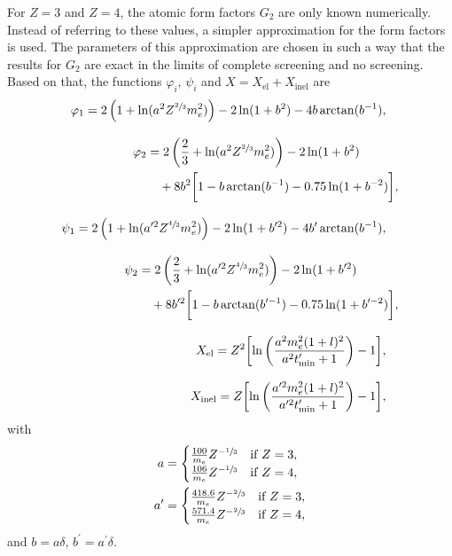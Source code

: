 For $Z=3$ and $Z=4$, the atomic form factors $G_2$ are only known numerically.
Instead of referring to these values, a simpler approximation for the form factors is used.
The parameters of this approximation are chosen in such a way that the results for $G_2$ are exact in the limits of complete screening and no screening.
Based on that, the functions $\varphi_i$, $\psi_i$ and $X = X_{\text{el}} + X_{\text{inel}}$ are \cite{RevModPhys.46.815}
%
\begingroup
\allowdisplaybreaks
\begin{align}
	\label{eqn:phi_1}
	\begin{split}
		\varphi_1 &= 2\left(1 + \ln(a^2 Z^{\sfrac{2}{3}} m_e^2)\right) - 2 \ln(1 + b^2) - 4 b \arctan(b^{-1}),
	\end{split}
	\\[2ex]
	\begin{split}
		\varphi_2 &= 2 \left(\frac{2}{3} + \ln(a^2 Z^{\sfrac{2}{3}} m_e^2 )\right) - 2 \ln(1 + b^2) \\&\quad+ 8 b^2  \biggl[ 1 - b \arctan(b^{-1}) - 0.75 \ln(1 + b^{-2}) \biggr],
	\end{split}
	\\[2ex]
	\begin{split}
		\psi_1 &= 2\left(1 + \ln(a^{\prime2} Z^{\sfrac{4}{3}} m_e^2)\right) - 2 \ln(1 + b^{\prime2}) - 4 b^{\prime} \arctan(b^{-1}),
	\end{split}
	\\[2ex]
	\begin{split}
		\psi_2 &= 2 \left(\frac{2}{3} + \ln(a^{\prime2} Z^{\sfrac{4}{3}} m_e^2 )\right) - 2 \ln(1 + b^{\prime2}) \\&\quad+ 8 b^{\prime2}  \biggl[ 1 - b \arctan(b^{\prime-1}) - 0.75 \ln(1 + b^{\prime-2}) \biggr],
	\end{split}
	\\[2ex]
	\begin{split}
		X_{\text{el}} &= Z^2 \biggl[ \ln\left( \frac{a^2 m_e^2 (1 + l)^2}{a^2 t_{\text{min}}^{\prime} + 1}\right) - 1 \biggr],
	\end{split}
	\\[2ex]
	\label{eqn:X_inel}
	\begin{split}
		X_{\text{inel}} &= Z \biggl[ \ln\left( \frac{a^{\prime2} m_e^2 (1 + l)^2 }{a^{\prime2} t_{\text{min}}^{\prime} + 1 } \right) - 1\biggr],
	\end{split}
\end{align}
\endgroup
%
with
%
\begin{align*}
	a &= 
	\begin{cases}
		\frac{100}{m_e} Z^{-\sfrac{1}{3}} & \text{if $Z = 3$},\\
		\frac{106}{m_e} Z^{-\sfrac{1}{3}} & \text{if $Z = 4$},\\
	\end{cases}\\
	a^{\prime} &= 
	\begin{cases}
		\frac{418.6}{m_e} Z^{-\sfrac{2}{3}} & \text{if $Z = 3$},\\
		\frac{571.4}{m_e} Z^{-\sfrac{2}{3}} & \text{if $Z = 4$},\\
	\end{cases}
\end{align*}
and $b = a \delta$, $b^{\prime} = a^{\prime} \delta$.
%


